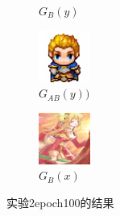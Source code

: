 \documentclass{beamer}
\begin{document}
\begin{frame}
\begin{figure}[htb]
\begin{subfigure}[b]{0.23\linewidth}
        \caption{$G_B(y)$}
      \end{subfigure}
      \begin{subfigure}[b]{0.23\linewidth}
        \includegraphics[width=\linewidth]{exp2_epoch100_rec_B.png}
        \caption{$G_{AB}(y))$}
      \end{subfigure}
      \begin{subfigure}[b]{0.23\linewidth}
        \includegraphics[width=\linewidth]{exp2_epoch100_idt_B.png}
        \caption{$G_B(x)$}
      \end{subfigure}
      \caption{实验2epoch100的结果}
      \label{fig:exp2epoch100}
\end{figure}

\end{frame}
\end{document}

